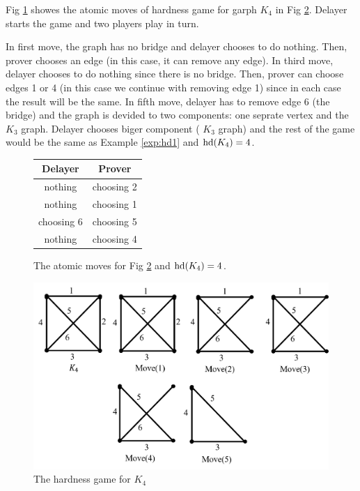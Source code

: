 \documentclass[12pt]{book}
\begin{document}
\begin{examp}\label{exp:hd2}
       Fig \ref{fig:game2} showes the atomic moves of hardness game for garph $K_4$ in Fig \ref{fig:hd2}. Delayer starts the game and two 
	   players play in turn. 
	   
	   In first move, the graph has no bridge and delayer chooses to do nothing. Then, prover chooses an edge (in this case, it can remove any edge). 
	   In third move, delayer chooses to do nothing since there is no bridge. Then, prover can choose edges 1 or 4 (in this case we continue with removing edge 1) since in each case 
	   the result will be the same. In fifth move, delayer has to remove edge 6 (the bridge) and the graph is devided to two components: 
	   one seprate vertex and the $K_3$ graph. Delayer chooses biger component ( $K_3$ graph) and the rest of the game would be the same as Example \ref{exp:hd1} and $\operatorname{hd}(K_4)=4$.
	 
	 \begin{figure}[h]
      \centering
      \begin{tabular}{|c|c|} 
      \hline
                  Delayer & Prover \\ \hline
                  nothing & choosing 2  \\ \hline
                  nothing & choosing 1  \\ \hline
                  choosing 6 & choosing 5  \\ \hline
                  nothing & choosing 4 \\ \hline
      \end{tabular}
      \caption{The atomic moves for Fig \ref{fig:hd2} and  $\operatorname{hd}(K_4)=4$.}
      \label{fig:game2}
      \end{figure}
	  \begin{figure}
      \begin{center}
      \includegraphics[scale =0.6]{g2.png}
      \caption{The hardness game for $K_4$}
	  \label{fig:hd2}
      \end{center}
      \end{figure}
	   
\end{examp}
\end{document}
